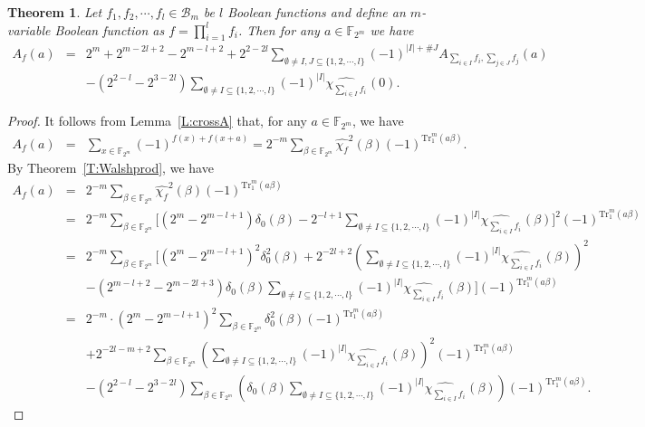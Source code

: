 \documentclass[10pt]{article}
\newtheorem{theorem}{Theorem}
\newcommand{\F}{\mathbb{F}}
\newcommand{\0}{\textbf{0}}
\newcommand{\1}{\textbf{1}}
\newcommand{\Tr}{\mathrm{Tr}_1^m}
\newcommand{\W}[2][]{\widehat{\chi_{#2}}^{#1}}
\newcommand{\CardI}{\left|I\right|}
\begin{document}
{\begin{theorem}\label{T:Autoprod}
Let $f_1,f_2,\cdots,f_l\in\mathcal{B}_m$ be $l$ Boolean functions and define an $m$-variable Boolean function as
$f=\prod_{i=1}^{l}f_i$. Then for any ${a}\in\F_{2^m}$ we have
\begin{eqnarray*}
A_f({a})&=&2^m+2^{m-2l+2}-2^{m-l+2}+2^{2-2l}\sum_{\emptyset\neq I, J \subseteq \{1,2,\cdots, l\}}(-1)^{\CardI+\# J}A_{\sum\limits_{i\in I}f_i, \sum\limits_{j\in J}f_j}({a})\\
&&-(2^{2-l}-2^{3-2l})\sum_{\emptyset\neq I\subseteq \{1,2,\cdots, l\}}(-1)^{\CardI}\W {\sum_{i\in I}f_i}(0).
\end{eqnarray*}
\end{theorem}
\begin{proof}
It follows from Lemma~\ref{L:crossA} that, for any ${a}\in\F_{2^m}$, we have
\begin{eqnarray*}
A_f({a})&=&\sum_{x\in\F_{2^m}}(-1)^{f(x)+f(x+{a})}=2^{-m}\sum_{\beta\in\F_{2^m}}\widehat{\chi_f}^2(\beta)(-1)^{\Tr({a}\beta)}.
\end{eqnarray*}
By Theorem~\ref{T:Walshprod}, we have
\begin{eqnarray*}
A_f({a})&=&2^{-m}\sum_{\beta\in\F_{2^m}}\widehat{\chi_f}^2(\beta)(-1)^{\Tr({a}\beta)}\\
&=&2^{-m}\sum_{\beta\in\F_{2^m}}\bigg[\left(2^m-2^{m-l+1}\right)\delta_0(\beta)-2^{-l+1}\sum_{\emptyset\neq I\subseteq \{1,2,\cdots, l\}}(-1)^{\CardI}\W {\sum_{i\in I}f_i}(\beta)\bigg]^2(-1)^{\Tr({a}\beta)}\\
&=&2^{-m}\sum_{\beta\in\F_{2^m}}\bigg[\left(2^m-2^{m-l+1}\right)^2\delta_0^2(\beta)
+2^{-2l+2}\left(\sum_{\emptyset\neq I\subseteq \{1,2,\cdots, l\}}(-1)^{\CardI}\W {\sum_{i\in I}f_i}(\beta)\right)^2\\
&&-(2^{m-l+2}-2^{m-2l+3})\delta_0(\beta)\sum_{\emptyset\neq I\subseteq \{1,2,\cdots, l\}}(-1)^{\CardI}\W {\sum_{i\in I}f_i}(\beta)\bigg](-1)^{\Tr({a}\beta)}\\
&=&2^{-m}\cdot \left(2^m-2^{m-l+1}\right)^2\sum_{\beta\in\F_{2^m}}\delta_0^2(\beta)(-1)^{\Tr({a}\beta)}\\
&&+2^{-2l-m+2}\sum_{\beta\in\F_{2^m}}\left(\sum_{\emptyset\neq I\subseteq \{1,2,\cdots, l\}}(-1)^{\CardI}\W {\sum_{i\in I}f_i}(\beta)\right)^2(-1)^{\Tr({a}\beta)}\\
&&-(2^{2-l}-2^{3-2l})\sum_{\beta\in\F_{2^m}}\left(\delta_0(\beta)\sum_{\emptyset\neq I\subseteq \{1,2,\cdots, l\}}(-1)^{\CardI}\W {\sum_{i\in I}f_i}(\beta)\right)(-1)^{\Tr({a}\beta)}.
\end{eqnarray*}

\end{proof}}
\end{document}
